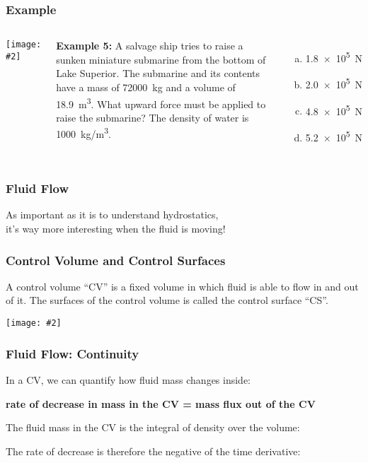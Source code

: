 \documentclass[12pt,aspectratio=169]{beamer}
\newcommand{\pic}[2]{\texttt{[image: \#2]}}
\newcommand{\eq}[2]{\vspace{#1}{\Large\begin{displaymath}#2\end{displaymath}}}
\begin{document}
\begin{frame}
  \frametitle{Example}

  \begin{columns}

    \pic{1}{hpa_b.jpg}

    \textbf{Example 5:} A salvage ship tries to raise a sunken miniature
    submarine from the bottom of Lake Superior. The submarine and its contents
    have a mass of \SI{72000}{kg} and a volume of \SI{18.9}{m^3}. What upward
    force must be applied to raise the submarine? The density of water is
    \SI{1000}{kg/m^3}.
    \begin{enumerate}[(a)]
    \item\SI{1.8e5}{\newton}
    \item\SI{2.0e5}{\newton}
    \item\SI{4.8e5}{\newton}
    \item\SI{5.2e5}{\newton}
    \end{enumerate}
    
  \end{columns}
\end{frame}



\begin{frame}
  \frametitle{Fluid Flow}

  \begin{center}
    As important as it is to understand hydrostatics,\\
    it's way more interesting when the fluid is moving!
  \end{center}
\end{frame}


\begin{frame}
  \frametitle{Control Volume and Control Surfaces}
  A control volume ``CV'' is a fixed volume in which fluid is able to flow in
  and out of it. The surfaces of the control volume is called the control
  surface ``CS''.
  \begin{center}
    \pic{.5}{CV-CS.jpg}
  \end{center}
\end{frame}

\begin{frame}
  \frametitle{Fluid Flow: Continuity}
  In a CV, we can quantify how fluid mass changes inside:
  \begin{center}
    \textbf{rate of decrease in mass in the CV = mass flux out of the CV}
  \end{center}

  The fluid mass in the CV is the integral of density over the volume:

  \eq{-.2in}{ \int_{CV}\rho dV }
  
  The rate of decrease is therefore the negative of the time derivative:
  
  \eq{-.25in}{
    -\frac{\partial}{\partial t}\int_{CV}\rho dV
  }
\end{frame}
\end{document}
